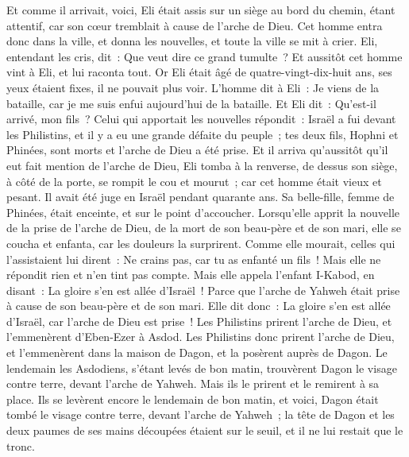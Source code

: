 \begin{multicols}{2}
Et comme il arrivait, voici, Eli était assis sur un siège au bord du chemin, étant attentif, car son cœur tremblait à cause de l'arche de Dieu. Cet homme entra donc dans la ville, et donna les nouvelles, et toute la ville se mit à crier.
Eli, entendant les cris, dit~: Que veut dire ce grand tumulte~? Et aussitôt cet homme vint à Eli, et lui raconta tout.
Or Eli était âgé de quatre-vingt-dix-huit ans, ses yeux étaient fixes, il ne pouvait plus voir.
L'homme dit à Eli~: Je viens de la bataille, car je me suis enfui aujourd'hui de la bataille. Et Eli dit~: Qu'est-il arrivé, mon fils~?
Celui qui apportait les nouvelles répondit~: Israël a fui devant les Philistins, et il y a eu une grande défaite du peuple~; tes deux fils, Hophni et Phinées, sont morts et l'arche de Dieu a été prise.
Et il arriva qu'aussitôt qu'il eut fait mention de l'arche de Dieu, Eli tomba à la renverse, de dessus son siège, à côté de la porte, se rompit le cou et mourut~; car cet homme était vieux et pesant. Il avait été juge en Israël pendant quarante ans.
Sa belle-fille, femme de Phinées, était enceinte, et sur le point d'accoucher. Lorsqu'elle apprit la nouvelle de la prise de l'arche de Dieu, de la mort de son beau-père et de son mari, elle se coucha et enfanta, car les douleurs la surprirent.
Comme elle mourait, celles qui l'assistaient lui dirent~: Ne crains pas, car tu as enfanté un fils~! Mais elle ne répondit rien et n'en tint pas compte.
Mais elle appela l'enfant I-Kabod, en disant~: La gloire s'en est allée d'Israël~! Parce que l'arche de Yahweh était prise à cause de son beau-père et de son mari.
Elle dit donc~: La gloire s'en est allée d'Israël, car l'arche de Dieu est prise~!
\VerseOne{}Les Philistins prirent l'arche de Dieu, et l'emmenèrent d'Eben-Ezer à Asdod.
Les Philistins donc prirent l'arche de Dieu, et l'emmenèrent dans la maison de Dagon, et la posèrent auprès de Dagon.
Le lendemain les Asdodiens, s'étant levés de bon matin, trouvèrent Dagon le visage contre terre, devant l'arche de Yahweh. Mais ils le prirent et le remirent à sa place.
Ils se levèrent encore le lendemain de bon matin, et voici, Dagon était tombé le visage contre terre, devant l'arche de Yahweh~; la tête de Dagon et les deux paumes de ses mains découpées étaient sur le seuil, et il ne lui restait que le tronc.

\end{multicols}
